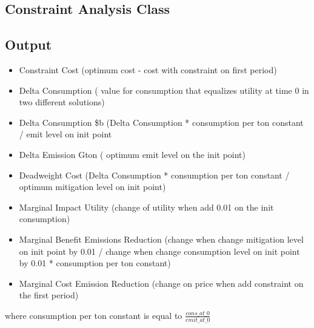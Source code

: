 \documentclass[12pt]{article}
\begin{document}
\subsection{Constraint Analysis Class}
\subsection{Output}
\begin{itemize}
     \item Constraint Cost (optimum cost - cost with constraint on first period)
     \item Delta Consumption ( value for consumption that equalizes utility at time 0 in two different solutions)
     \item Delta Consumption \$b (Delta Consumption * consumption per ton constant / emit level on init point
     \item Delta Emission Gton ( optimum emit level on the init point)
     \item Deadweight Cost (Delta Consumption * consumption per ton constant / optimum mitigation level on init point)
     \item Marginal Impact Utility (change of utility when add 0.01 on the init consumption)
     \item Marginal Benefit Emissions Reduction (change when change mitigation level on init point by 0.01 / change when change consumption level on init point by 0.01 * consumption per ton constant)
     \item Marginal Cost Emission Reduction (change on price when add constraint on the first period)
\end{itemize}
where consumption per ton constant is equal to $\frac{cons\_at\_0}{emit\_at\_0}$
\end{document}
